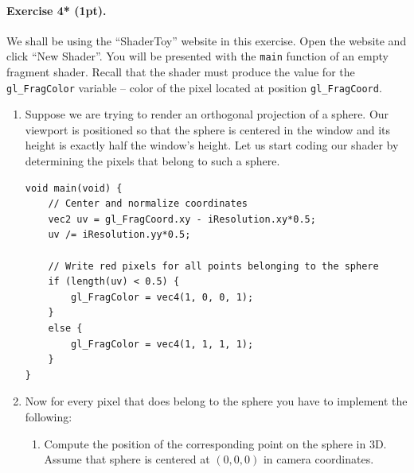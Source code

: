 \documentclass{article}
\newenvironment{exercise}[2]{\paragraph{Exercise #1 (#2pt).} }{
\medskip}
\begin{document}
\begin{exercise}{4*}{1}
We shall be using the ``ShaderToy'' website in this exercise. Open the website and click ``New Shader''. You will be presented with the \texttt{main} function of an empty fragment shader. Recall that the shader must produce the value for the \verb#gl_FragColor# variable -- color of the pixel located at position \verb#gl_FragCoord#.

\begin{enumerate}
\item Suppose we are trying to render an orthogonal projection of a sphere. Our viewport is positioned so that the sphere is centered in the window and its height is exactly half the window's height. Let us start coding our shader by determining the pixels that belong to such a sphere.
\begin{lstlisting}
void main(void) {
    // Center and normalize coordinates
	vec2 uv = gl_FragCoord.xy - iResolution.xy*0.5;
	uv /= iResolution.yy*0.5;
	
	// Write red pixels for all points belonging to the sphere
	if (length(uv) < 0.5) {
		gl_FragColor = vec4(1, 0, 0, 1);
	}
	else {
		gl_FragColor = vec4(1, 1, 1, 1);
	}
}
\end{lstlisting}
\item Now for every pixel that does belong to the sphere you have to implement the following: 
\begin{enumerate}
\item Compute the position of the corresponding point on the sphere in 3D. Assume that sphere is centered at $(0, 0, 0)$ in camera coordinates.


\end{enumerate}
\end{enumerate}
\end{exercise}
\end{document}
